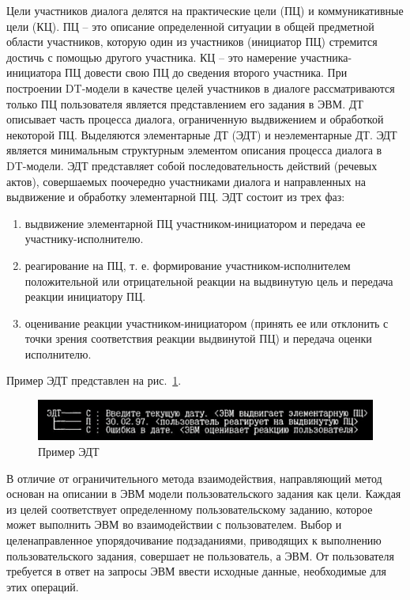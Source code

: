 Цели участников диалога делятся на практические цели (ПЦ) и коммуникативные цели (КЦ). ПЦ -- это описание определенной ситуации в общей предметной области участников, которую один из участников (инициатор ПЦ) стремится достичь с помощью другого участника. КЦ -- это намерение участника-инициатора ПЦ довести свою ПЦ до сведения второго участника. При построении DT-модели в качестве целей участников в диалоге рассматриваются только ПЦ пользователя является представлением его задания в ЭВМ. ДТ описывает часть процесса диалога, ограниченную выдвижением и обработкой некоторой ПЦ. Выделяются элементарные ДТ (ЭДТ) и неэлементарные ДТ. ЭДТ является минимальным структурным элементом описания процесса диалога в DT-модели. ЭДТ представляет собой последовательность действий (речевых актов), совершаемых поочередно участниками диалога и направленных на выдвижение и обработку элементарной ПЦ. ЭДТ состоит из трех фаз:
\begin{enumerate}
	\item выдвижение элементарной ПЦ участником-инициатором и передача ее участнику-исполнителю.
	\item реагирование на ПЦ, т. е. формирование участником-исполнителем положительной или отрицательной реакции на выдвинутую цель и передача реакции инициатору ПЦ.
	\item оценивание реакции участником-инициатором (принять ее или отклонить с точки зрения соответствия реакции выдвинутой ПЦ) и передача оценки исполнителю.
\end{enumerate}

	
Пример ЭДТ представлен на рис.~\ref{rndhpcgui.2022.10.10.example}.
\begin{figure}[!ht]
  \centering
  \includegraphics[scale=0.8]{ResearchNotes/rndhpc_int_gui_2022_10_10/rndhpcgui.2022.10.10.example.png}
  \caption{Пример ЭДТ}
  \label{rndhpcgui.2022.10.10.example}
\end{figure}

	
В отличие от ограничительного метода взаимодействия, направляющий метод основан на описании в ЭВМ модели пользовательского задания как цели. Каждая из целей соответствует определенному пользовательскому заданию, которое может выполнить ЭВМ во взаимодействии с пользователем. Выбор и целенаправленное упорядочивание подзаданиями, приводящих к выполнению пользовательского задания, совершает не пользователь, а ЭВМ. От пользователя требуется в ответ на запросы ЭВМ ввести исходные данные, необходимые для этих операций.

